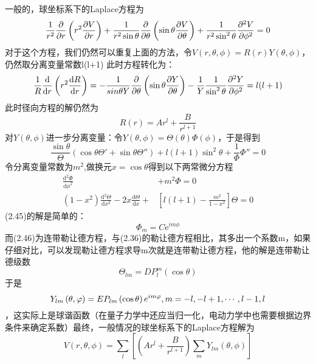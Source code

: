 \documentclass[14pt,oneside]{book}
\begin{document}
\begin{large}
\begin{enumerate}
一般的，球坐标系下的Laplace方程为
\begin{equation}
  \frac{1}{r^2}\pdv{}{r}\left(r^2\pdv{V}{r}\right) +\frac{1}{r^2\sin\theta}\pdv{}{\theta }\left(\sin\theta\pdv{V}{\theta}\right)+\frac{1}{r^2\sin^2\theta}\pdv[2]{V}{\phi}=0
\end{equation}
对于这个方程，我们仍然可以重复上面的方法，令$V(r,\theta,\phi)=R(r)Y(\theta,\phi)$，仍然取分离变量常数l(l+1)
此时方程转化为：
\begin{equation}
  \frac{1}{R}\frac{\rm d}{\mathrm{d}r}\left(r^2\frac{\mathrm{d}R}{\mathrm{d}r}\right)=-\frac{1}{sin\theta Y}\frac{\partial}{\partial \theta}\left(\sin\theta\frac{\partial Y}{\partial\theta}\right)-\frac{1}{Y}\frac{1}{\sin^2\theta}\frac{\partial^2 Y}{\partial \phi^2}=l(l+1)\\
\end{equation}
此时径向方程的解仍然为
\begin{equation}
  R(r)=Ar^l+\frac{B}{r^{l+1}}
\end{equation}
对$Y(\theta,\phi)$进一步分离变量：令$Y(\theta,\phi)=\Theta(\theta)\Phi(\phi)$，于是得到
\begin{equation}
  \frac{\sin{\theta}}{\Theta}(\cos\theta\Theta'+\sin\theta\Theta'')+l(l+1)\sin^2\theta+\frac{1}{\Phi}\Phi''=0
\end{equation}
令分离变量常数为$m^2$,做换元$x=\cos{\theta}$得到以下两常微分方程
\begin{align}
		\frac{\mathrm{d}^2 \Phi}{\mathrm{d} \phi^2}&+m^2 \Phi=0 \\
\left(1-x^2\right) \frac{\mathrm{d}^2 \Theta}{\mathrm{d} x^2}-2 x \frac{\mathrm{d} \Theta}{\mathrm{d} x}+&\left[l(l+1)-\frac{m^2}{1-x^2}\right] \Theta=0
\end{align}
(2.45)的解是简单的：
\begin{equation}
  \Phi_m=C\mathrm{e}^{im\phi}
\end{equation}
而(2.46)为连带勒让德方程，与(2.36)的勒让德方程相比，其多出一个系数m，如果仔细对比，可以发现勒让德方程求导m次就是连带勒让德方程，他的解是连带勒让德级数
\begin{equation}
  \Theta_{lm}=D P_l^m(\cos \theta)
\end{equation}
于是
\begin{equation}
 {{Y}_{lm}}\left( \theta ,\varphi \right)=E{{P}_{lm}}\left( \cos \theta \right){{e}^{im\varphi }},m=-l,-l+1,\cdots,l-1,l\\
\end{equation}
，这实际上是球谐函数（在量子力学中还应当归一化，电动力学中也需要根据边界条件来确定系数）最终，一般情况的球坐标系下的Laplace方程解为
\begin{equation}
 V(r,\theta,\phi)=  \sum_l\left[ \left(Ar^l+\frac{B}{r^{l+1}}\right)\sum_m Y_{lm}(\theta,\phi)\right]
\end{equation}



\end{enumerate}
\end{large}
\end{document}
